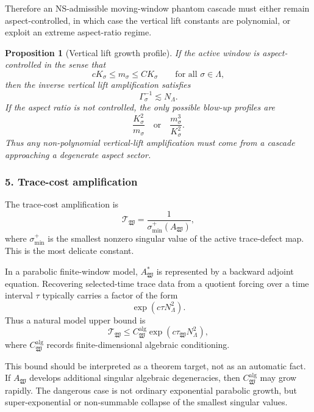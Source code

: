 \documentclass[11pt]{article}
\numberwithin{equation}{section}
\newtheorem{proposition}[theorem]{Proposition}
\begin{document}
Therefore an NS-admissible moving-window phantom cascade must either remain aspect-controlled, in which case the vertical lift constants are polynomial, or exploit an extreme aspect-ratio regime.

\begin{proposition}[Vertical lift growth profile]
If the active window is aspect-controlled in the sense that
\[
cK_\sigma\le m_\sigma\le C K_\sigma
\qquad
\text{for all }\sigma\in\Lambda,
\]
then the inverse vertical lift amplification satisfies
\[
\Gamma_\sigma^{-1}\lesssim N_\Lambda.
\]
If the aspect ratio is not controlled, the only possible blow-up profiles are
\[
\frac{K_\sigma^2}{m_\sigma}
\quad\text{or}\quad
\frac{m_\sigma^3}{K_\sigma^2}.
\]
Thus any non-polynomial vertical-lift amplification must come from a cascade approaching a degenerate aspect sector.
\end{proposition}

\subsubsection*{5. Trace-cost amplification}

The trace-cost amplification is
\[
\mathcal T_{\mathfrak W} =
\frac1{\sigma_{\min}^+(A_{\mathfrak W})},
\]
where \(\sigma_{\min}^+\) is the smallest nonzero singular value of the active trace-defect map. This is the most delicate constant.

In a parabolic finite-window model, \(A_{\mathfrak W}^*\) is represented by a backward adjoint equation. Recovering selected-time trace data from a quotient forcing over a time interval \(\tau\) typically carries a factor of the form
\[
\exp(c\tau N_\Lambda^2).
\]
Thus a natural model upper bound is
\[
\mathcal T_{\mathfrak W}
\le
C_{\mathfrak W}^{\mathrm{alg}}
\exp(c\tau_{\mathfrak W}N_\Lambda^2),
\]
where \(C_{\mathfrak W}^{\mathrm{alg}}\) records finite-dimensional algebraic conditioning.

This bound should be interpreted as a theorem target, not as an automatic fact. If \(A_{\mathfrak W}\) develops additional singular algebraic degeneracies, then \(C_{\mathfrak W}^{\mathrm{alg}}\) may grow rapidly. The dangerous case is not ordinary exponential parabolic growth, but super-exponential or non-summable collapse of the smallest singular values.
\end{document}
